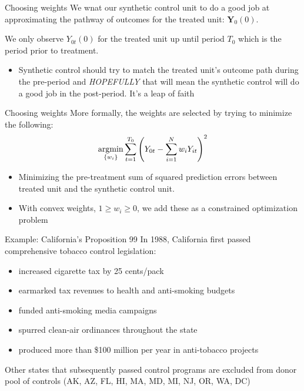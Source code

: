 \documentclass[t]{beamer}
\begin{document}
\begin{frame}{Choosing weights}
  We wnat our synthetic control unit to do a good job at approximating the pathway of outcomes for the treated unit: $\bm{Y}_0(0)$.

  \pause
  \bigskip
  We only observe $Y_{0t}(0)$ for the treated unit up until period $T_0$ which is the period prior to treatment.
  \begin{itemize}
    \item Synthetic control should try to match the treated unit's outcome path during the pre-period and \emph{HOPEFULLY} that will mean the synthetic control will do a good job in the post-period. It's a leap of faith
  \end{itemize}
\end{frame}

\begin{frame}{Choosing weights}
  More formally, the weights are selected by trying to minimize the following:
  $$
    \operatorname*{argmin}_{ \{ w_i \} } \sum_{t=1}^{T_0} \left( Y_{0t} - \sum_{i=1}^N w_i Y_{it} \right)^2
  $$
  \begin{itemize}
    \item Minimizing the pre-treatment sum of squared prediction errors between treated unit and the synthetic control unit.
    \item With convex weights, $1 \geq w_i \geq 0$, we add these as a constrained optimization problem
  \end{itemize}
\end{frame}


\begin{frame}{Example: California's Proposition 99}
	In 1988, California first passed comprehensive tobacco control legislation:
  \begin{itemize}
		\item increased cigarette tax by 25 cents/pack
		\item earmarked tax revenues to health and anti-smoking budgets
		\item funded anti-smoking media campaigns
		\item spurred clean-air ordinances throughout the state
		\item produced more than \$100 million per year in anti-tobacco projects
  \end{itemize}

  \bigskip Other states that subsequently passed control programs are excluded from donor pool of controls (AK, AZ, FL, HI, MA, MD, MI, NJ, OR, WA, DC)
\end{frame}
\end{document}
